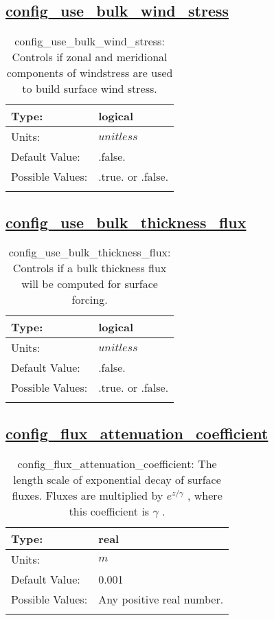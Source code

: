 \subsection[config\_use\_bulk\_wind\_stress]{\hyperref[sec:nm_tab_forcing]{config\_use\_bulk\_wind\_stress}}
\label{subsec:nm_sec_config_use_bulk_wind_stress}
\begin{center}
\begin{longtable}{| p{2.0in} || p{4.0in} |}
    \hline
    Type: & logical \\
    \hline
    Units: & $unitless$ \\
    \hline
    Default Value: & .false. \\
    \hline
    Possible Values: & .true. or .false. \\
    \hline
    \caption{config\_use\_bulk\_wind\_stress: Controls if zonal and meridional components of windstress are used to build surface wind stress.}
\end{longtable}
\end{center}
\subsection[config\_use\_bulk\_thickness\_flux]{\hyperref[sec:nm_tab_forcing]{config\_use\_bulk\_thickness\_flux}}
\label{subsec:nm_sec_config_use_bulk_thickness_flux}
\begin{center}
\begin{longtable}{| p{2.0in} || p{4.0in} |}
    \hline
    Type: & logical \\
    \hline
    Units: & $unitless$ \\
    \hline
    Default Value: & .false. \\
    \hline
    Possible Values: & .true. or .false. \\
    \hline
    \caption{config\_use\_bulk\_thickness\_flux: Controls if a bulk thickness flux will be computed for surface forcing.}
\end{longtable}
\end{center}
\subsection[config\_flux\_attenuation\_coefficient]{\hyperref[sec:nm_tab_forcing]{config\_flux\_attenuation\_coefficient}}
\label{subsec:nm_sec_config_flux_attenuation_coefficient}
\begin{center}
\begin{longtable}{| p{2.0in} || p{4.0in} |}
    \hline
    Type: & real \\
    \hline
    Units: & $m$ \\
    \hline
    Default Value: & 0.001 \\
    \hline
    Possible Values: & Any positive real number. \\
    \hline
    \caption{config\_flux\_attenuation\_coefficient:  The length scale of exponential decay of surface fluxes. Fluxes are multiplied by  $e^{z/\gamma}$ , where this coefficient is  $\gamma$ .}
\end{longtable}
\end{center}
